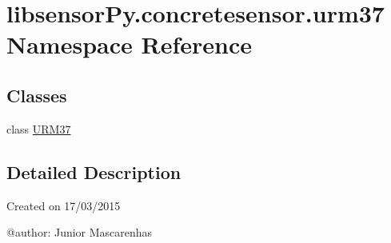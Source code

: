 \hypertarget{namespacelibsensorPy_1_1concretesensor_1_1urm37}{}\section{libsensor\+Py.\+concretesensor.\+urm37 Namespace Reference}
\label{namespacelibsensorPy_1_1concretesensor_1_1urm37}
\subsection*{Classes}
\begin{DoxyCompactItemize}
\item 
class \hyperlink{classlibsensorPy_1_1concretesensor_1_1urm37_1_1URM37}{U\+R\+M37}
\end{DoxyCompactItemize}


\subsection{Detailed Description}
\begin{DoxyVerb}Created on 17/03/2015

@author: Junior Mascarenhas
\end{DoxyVerb}
 